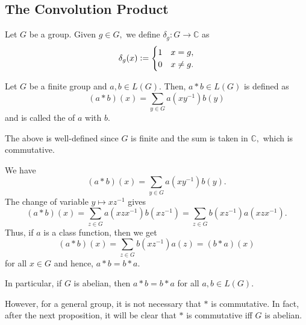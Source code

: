 \documentclass[12pt]{article}	%
\begin{document}
\subsection{The Convolution Product}

\begin{defn}
    Let $G$ be a group.
    Given $g \in G,$ we define $\delta_g : G \to \mathbb{C}$ as
    \begin{equation*}
        \delta_g(x) \vcentcolon=
        \begin{cases}
            1 & x = g, \\
            0 & x \neq g.
        \end{cases}
    \end{equation*}
\end{defn}

\begin{defn}
    Let $G$ be a finite group and $a, b \in L(G).$ Then, $a * b \in L(G)$ is defined as
    \begin{equation*}
        (a * b)(x) = \sum_{y \in G} a(xy^{-1})b(y)
    \end{equation*}
    and is called the  of $a$ with $b.$
\end{defn}

The above is well-defined since $G$ is finite and the sum is taken in $\mathbb{C},$ which is commutative. 

\begin{rem} \label{rem:classfunctionincenter}
    We have
    \begin{equation*}
        (a * b)(x) = \sum_{y \in G} a(xy^{-1})b(y).
    \end{equation*}
    The change of variable $y \mapsto xz^{-1}$ gives
    \begin{equation*}
        (a * b)(x) = \sum_{z \in G} a(xzx^{-1})b(xz^{-1}) = \sum_{z \in G} b(xz^{-1})a(xzx^{-1}).
    \end{equation*}
    Thus, if $a$ is a class function, then we get
    \begin{equation*}
        (a * b)(x) = \sum_{z \in G} b(xz^{-1})a(z) = (b * a)(x)
    \end{equation*}
    for all $x \in G$ and hence, $a * b = b * a.$
    
    In particular, if $G$ is abelian, then $a * b = b * a$ for all $a, b \in L(G).$
    
    However, for a general group, it is not necessary that $*$ is commutative. In fact, after the next proposition, it will be clear that $*$ is commutative iff $G$ is abelian.
\end{rem}
\end{document}
